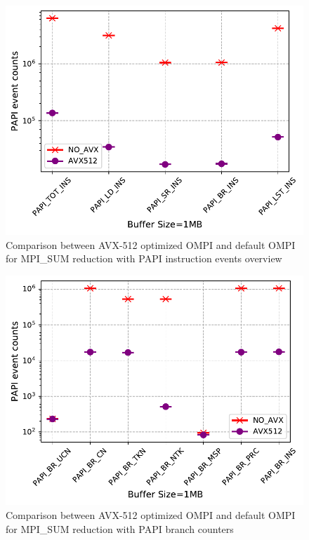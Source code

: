 \documentclass[5p,times,twocolumn]{elsarticle}
\begin{document}
\begin{figure}[h]
    \centering
    \includegraphics[width=\linewidth]{papi_ins_review.pdf}
    \caption{Comparison between AVX-512 optimized OMPI and default OMPI for MPI\_SUM reduction with PAPI instruction events overview}
    \label{fig:papiins}%
\end{figure}

\begin{figure}[h]
    \centering
    \includegraphics[width=\linewidth]{papi_BR_review.pdf}
    \caption{Comparison between AVX-512 optimized OMPI and default OMPI for MPI\_SUM reduction with PAPI branch counters}
    \label{fig:papibr}
\end{figure}
\end{document}
